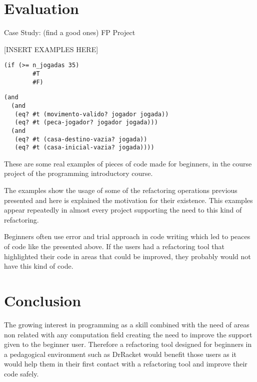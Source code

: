 \section{Evaluation} %
Case Study: (find a good ones) FP Project

[INSERT EXAMPLES HERE]
\begin{lstlisting}[basicstyle=\ttfamily, caption="Sample code"]
  (if (>= n_jogadas 35)
        #T
        #F)
\end{lstlisting}

\begin{lstlisting}[basicstyle=\ttfamily, caption="Refactoring and expression"]
(and
  (and
   (eq? #t (movimento-valido? jogador jogada))
   (eq? #t (peca-jogador? jogador jogada)))
  (and
   (eq? #t (casa-destino-vazia? jogada))
   (eq? #t (casa-inicial-vazia? jogada))))
\end{lstlisting}


These are some real examples of pieces of code made for beginners, in the course
project of the programming introductory course.



The examples show the usage of some of the refactoring operations previous presented
and here is explained the motivation for their existence.
This examples appear repeatedly in almost every project supporting the need to
this kind of refactoring.

Beginners often use error and trial approach in code writing which led %
to peaces of code like the presented above.
If the users had a refactoring tool that highlighted their code in areas that
could be improved, they probably would not have this kind of code.


\section{Conclusion}



The growing interest in programming as a skill combined with the need of areas
non related with any computation field creating the need to improve the support
given to the beginner user. %
Therefore a refactoring tool designed for beginners in a pedagogical environment such as DrRacket %
 would benefit those users as it would help them in their first contact with a
 refactoring tool and improve their code safely. %

